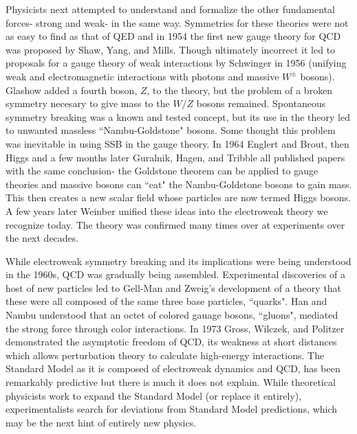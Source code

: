 Physicists next attempted to understand and formalize the other fundamental forces- strong and weak- in the same way. Symmetries for these theories were not as easy to find as that of QED and in 1954 the first new gauge theory for QCD was proposed by Shaw, Yang, and Mills. Though ultimately incorrect it led to proposals for a gauge theory of weak interactions by Schwinger in 1956 (unifying weak and electromagnetic interactions with photons and massive $W^\pm$ bosons). Glashow added a fourth boson, $Z$, to the theory, but the problem of a broken symmetry necesary to give mass to the $W/Z$ bosons remained. Spontaneous symmetry breaking was a known and tested concept, but its use in the theory led to unwanted massless ``Nambu-Goldstone" bosons. Some thought this problem was inevitable in using SSB in the gauge theory. In 1964 Englert and Brout, then Higgs and a few months later Guralnik, Hagen, and Tribble all published papers with the same conclusion- the Goldstone theorem can be applied to gauge theories and massive bosons can ``eat" the Nambu-Goldstone bosons to gain mass. This then creates a new scalar field whose particles are now termed Higgs bosons. A few years later Weinber unified these ideas into the electroweak theory we recognize today. The theory was confirmed many times over at experiments over the next decades. 

While electroweak symmetry breaking and its implications were being understood in the 1960s, QCD was gradually being assembled. Experimental discoveries of a host of new particles led to Gell-Man and Zweig's development of a theory that these were all composed of the same three base particles, ``quarks". Han and Nambu understood that an octet of colored gauage bosons, ``gluons", mediated the strong force through color interactions. In 1973 Gross, Wilczek, and Politzer demonstrated the asymptotic freedom of QCD, its weakness at short distances which allows perturbation theory to calculate high-energy interactions. The Standard Model as it is composed of electroweak dynamics and QCD, has been remarkably predictive but there is much it does not explain. While theoretical physicists work to expand the Standard Model (or replace it entirely), experimentalists search for deviations from Standard Model predictions, which may be the next hint of entirely new physics. 

